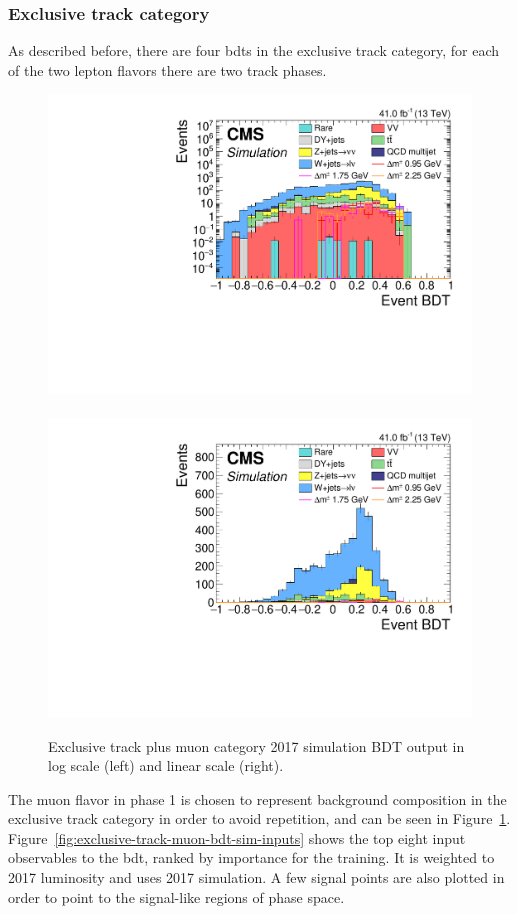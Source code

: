 \clearpage
\subsubsection{Exclusive track category}

As described before, there are four \glspl{bdt} in the exclusive track category, for each of the two lepton flavors there are two track phases. 

\begin{figure}[!htb]
\centering
\includegraphics[width=0.48\linewidth]{plots/track_muon_bg_signal/none_exTrack_dilepBDTCorrJetNoMultIso10Dr0.6_log.pdf} \,
\includegraphics[width=0.48\linewidth]{plots/track_muon_bg_signal/none_exTrack_dilepBDTCorrJetNoMultIso10Dr0.6.pdf} \\

\caption[Exclusive track plus muon 2017 simulation BDT output]{Exclusive track plus muon category 2017 simulation BDT output in log scale (left) and linear scale (right).}
\label{fig:exclusive-track-bdt-sim-output}
\end{figure}

The muon flavor in phase 1 is chosen to represent background composition in the exclusive track category in order to avoid repetition, and can be seen in Figure~\ref{fig:exclusive-track-bdt-sim-output}. Figure~\ref{fig:exclusive-track-muon-bdt-sim-inputs} shows the top eight input observables to the \gls{bdt}, ranked by importance for the training. It is weighted to 2017 luminosity and uses 2017 simulation. A few signal points are also plotted in order to point to the signal-like regions of phase space.

